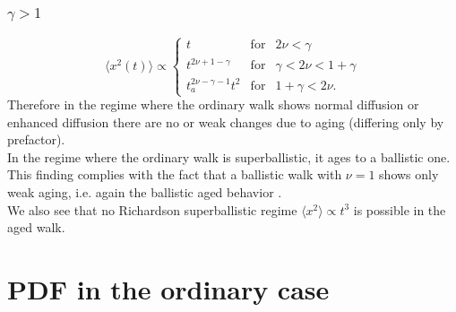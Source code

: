 \subsubsection{$\gamma> 1$ }
\begin{equation}
  \langle x^2(t) \rangle \propto  \left\{
  \begin{array}{lll}
    t & \mathrm{for} & 2\nu < \gamma  \\
    t^{2\nu+1-\gamma} &\mathrm{for} & \gamma <2 \nu < 1+\gamma \\ 
   t_a^{2\nu-\gamma-1 }t^2 & \mathrm{for} & 1+\gamma < 2\nu.
  \end{array}
  \right.
\end{equation}
Therefore in the regime where the ordinary walk shows normal diffusion or enhanced diffusion there are no or weak changes due to aging (differing only by prefactor). \\
In the regime where the ordinary walk is superballistic, it ages to a ballistic one. This finding complies with the fact that a ballistic walk with $\nu = 1$ shows only weak aging, i.e. again the ballistic aged behavior 
\cite{Magdziarz, Froemberg}. \\
We also see that no Richardson superballistic regime $\langle x^2 \rangle \propto t^3$ is possible in the aged walk. 

\section{PDF in the ordinary case} 
\label{sec:calcPDF}

